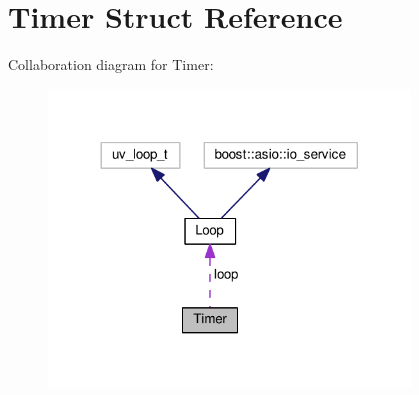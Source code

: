 \hypertarget{struct_timer}{}\section{Timer Struct Reference}
\label{struct_timer}


Collaboration diagram for Timer\+:
\nopagebreak
\begin{figure}[H]
\begin{center}
\leavevmode
\includegraphics[width=272pt]{struct_timer__coll__graph}
\end{center}
\end{figure}
